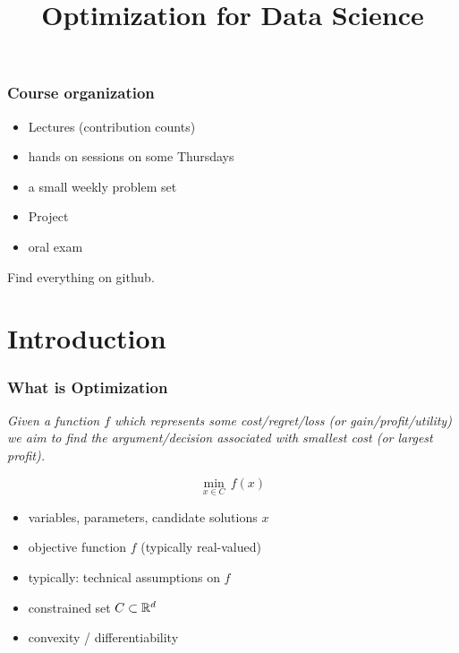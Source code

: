\documentclass{beamer}
\title{Optimization for Data Science}
\begin{document}
\maketitle
\frame{\tableofcontents[currentsection]}

\begin{frame}
  \frametitle{Course organization}
  \begin{itemize}
    \item Lectures (contribution counts)
    \item hands on sessions on some Thursdays
    \item a small weekly problem set
    \item Project
    \item oral exam
  \end{itemize}

  Find everything on github.

\end{frame}



\section{Introduction}

\begin{frame}
  \frametitle{What is Optimization}

  \begin{center}
    \textit{Given a function $f$ which represents some cost/regret/loss (or gain/profit/utility) we aim to find the argument/decision associated with smallest cost (or largest profit).}
  \end{center}

  \begin{equation}
    \min_{x\in C } \, f(x)
  \end{equation}

  \begin{itemize}
    \item variables, parameters, candidate solutions $x$
    \item objective function $f$ (typically real-valued)
    \item typically: technical assumptions on $f$
    \item constrained set $C \subset \mathbb{R}^d$
    \item convexity / differentiability
  \end{itemize}
\end{frame}
\end{document}
